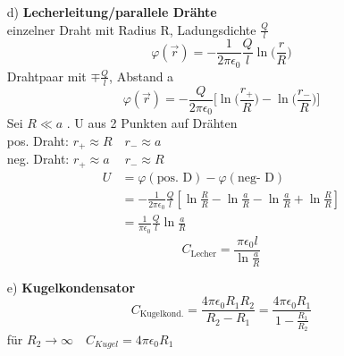 \documentclass[titlepage,12pt,a4paper,ngerman]{report}
\newcommand{\tx}[1]{\textrm{#1}}
\begin{document}
\begin{itemize}
\begin{itemize}

\item[d)] \textbf{Lecherleitung/parallele Drähte}\\
einzelner Draht mit Radius R, Ladungsdichte $\frac{Q}{l}$
$$\varphi(\vec{r}) =-\frac{1}{2\pi\epsilon_0} \frac{Q}{l} \ln\Big(\frac{r}{R}\Big)$$
Drahtpaar mit $\mp \frac{Q}{l}$, Abstand a
$$ \varphi(\vec{r}) = -\frac{Q}{2\pi\epsilon_0} \bigg[ \ln\Big(\frac{r_+}{R}\Big) - \ln\Big(\frac{r_-}{R}\Big) \bigg]$$
Sei $ R \ll a$ . U aus 2 Punkten auf Drähten\\
pos. Draht: $r_+ \approx R \quad r_- \approx a$\\
neg. Draht: $r_+ \approx a \quad\: r_- \approx R$\\
\begin{align*}
U &= \varphi(\tx{pos. D}) - \varphi(\tx{neg- D})\\
&= -\frac{1}{2\pi\epsilon_0} \frac{Q}{l} [\ln\frac{R}{R} - \ln\frac{a}{R} - \ln\frac{a}{R} + \ln\frac{R}{R}] \\
&= \frac{1}{\pi \epsilon_0} \frac{Q}{l} \ln\frac{a}{R}
\end{align*}
$$\boxed{C_{\tx{Lecher}} = \frac{\pi\epsilon_0 l}{\ln\frac{a}{R}}}$$


\item[e)] \textbf{Kugelkondensator}
$$\boxed{C_{\textrm{Kugelkond.}}} = \frac{4 \pi \epsilon_0 R_1 R_2}{R_2 - R_1} \boxed{= \frac{4 \pi\epsilon_0 R_1}{1 - \frac{R_1}{R_2}}}$$
für $R_2 \rightarrow \infty \quad C_{Kugel} = 4 \pi \epsilon_0 R_1$

\end{itemize}

\end{itemize}
\end{document}
